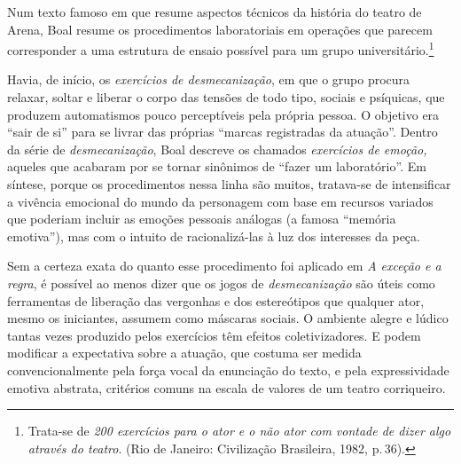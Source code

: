 Num texto famoso em que resume aspectos técnicos da história do teatro
de Arena, Boal resume os procedimentos laboratoriais em operações que
parecem corresponder a uma estrutura de ensaio possível para um grupo
universitário.\footnote{Trata-se de {\it 200 exercícios para o ator e o
  não ator com vontade de dizer algo através do teatro}. (Rio de
  Janeiro: Civilização Brasileira, 1982, p.\,36).}

Havia, de início, os {\it exercícios de desmecanização}, em que o grupo
procura relaxar, soltar e liberar o corpo das tensões de todo tipo,
sociais e psíquicas, que produzem automatismos pouco perceptíveis pela
própria pessoa. O objetivo era “sair de si” para se livrar das próprias
“marcas registradas da atuação”. Dentro da série de
{\it desmecanização}, Boal descreve os chamados {\it exercícios de
emoção,} aqueles que acabaram por se tornar sinônimos de “fazer um
laboratório”. Em síntese, porque os procedimentos nessa linha são
muitos, tratava-se de intensificar a vivência emocional do mundo da
personagem com base em recursos variados que poderiam incluir as emoções
pessoais análogas (a famosa “memória emotiva”), mas com o intuito de
racionalizá-las à luz dos interesses da peça.


Sem a certeza exata do quanto esse procedimento foi aplicado em {\it A
exceção e a regra}, é possível ao menos dizer que os jogos de
{\it desmecanização} são úteis como ferramentas de liberação das
vergonhas e dos estereótipos que qualquer ator, mesmo os iniciantes,
assumem como máscaras sociais. O ambiente alegre e lúdico tantas vezes
produzido pelos exercícios têm efeitos coletivizadores. E podem
modificar a expectativa sobre a atuação, que costuma ser medida
convencionalmente pela força vocal da enunciação do texto, e pela
expressividade emotiva abstrata, critérios comuns na escala de valores
de um teatro corriqueiro.

